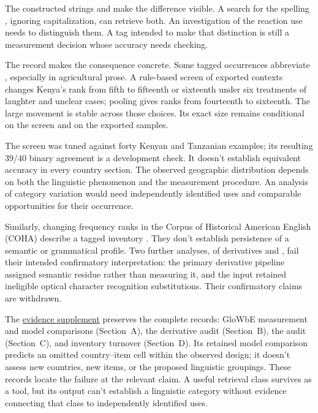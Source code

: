 \documentclass[12pt]{article}
\begin{document}
The constructed strings  and  make the difference visible. A search for the spelling
, ignoring capitalization, can retrieve both. An investigation
of the reaction use needs to distinguish them. A tag intended to
make that distinction is still a measurement decision whose accuracy
needs checking.

The  record makes the consequence concrete. Some tagged
occurrences abbreviate , especially in agricultural prose.
A rule-based screen of exported contexts changes Kenya's rank from fifth
to fifteenth or sixteenth under six treatments of laughter and unclear
cases; pooling gives ranks from fourteenth to sixteenth. The large
movement is stable across those choices. Its exact size remains
conditional on the screen and on the exported samples.

The screen was tuned against forty Kenyan and Tanzanian examples;
its resulting 39/40 binary agreement is a development check. It doesn't
establish equivalent accuracy in every country section. The observed
geographic distribution depends on both the linguistic
phenomenon and the measurement procedure. An analysis of category
variation would need independently identified uses and comparable
opportunities for their occurrence.

Similarly, changing frequency ranks in the Corpus of Historical American
English (COHA) describe a tagged inventory \citep{davies2010}.
They don't establish persistence of a semantic or grammatical profile.
Two further analyses, of derivatives and , fail their
intended confirmatory interpretation: the primary derivative pipeline
assigned semantic residue rather than measuring it, and the 
input retained ineligible optical character recognition substitutions.
Their confirmatory claims are withdrawn.

The \href{inquiry-relative-evidence-supplement.pdf}{evidence supplement}
preserves the complete records: GloWbE measurement and model comparisons
(Section~A), the derivative audit (Section~B), the  audit
(Section~C), and inventory turnover (Section~D). Its retained model
comparison predicts an omitted country--item cell within the observed
design; it doesn't assess new countries, new items, or the proposed
linguistic groupings. These records locate
the failure at the relevant claim. A useful retrieval class survives
as a tool, but its output can't establish a linguistic category
without evidence connecting that class to independently identified uses.
\end{document}
